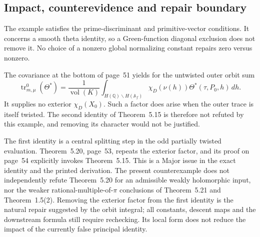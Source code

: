 \documentclass[10pt]{article}
\begin{document}
\subsection*{Impact, counterevidence and repair boundary}
The example satisfies the prime-discriminant and primitive-vector conditions. It concerns a smooth theta identity, so a Green-function diagonal exclusion does not remove it. No choice of a nonzero global normalizing constant repairs zero versus nonzero.\par
The covariance at the bottom of page 51 yields for the untwisted outer orbit sum \[\operatorname{tr}^0_{m,\mu}(\Theta^*)=
 \frac1{\operatorname{vol}(K)}
 \int_{H(\mathbb Q)\backslash H(\mathbb A_f)}
 \chi_D(\nu(h))\Theta^*(\tau,P_0,h)\,dh .\] It supplies no exterior \(\chi_D(X_0)\). Such a factor does arise when the outer trace is itself twisted. The second identity of Theorem 5.15 is therefore not refuted by this example, and removing its character would not be justified.\par
The first identity is a central splitting step in the odd partially twisted evaluation. Theorem 5.20, page 53, repeats the exterior factor, and its proof on page 54 explicitly invokes Theorem 5.15. This is a Major issue in the exact identity and the printed derivation. The present counterexample does not independently refute Theorem 5.20 for an admissible weakly holomorphic input, nor the weaker rational-multiple-of-\(\pi\) conclusions of Theorem 5.21 and Theorem 1.5(2). Removing the exterior factor from the first identity is the natural repair suggested by the orbit integral; all constants, descent maps and the downstream formula still require rechecking. Its local form does not reduce the impact of the currently false principal identity.\par
\end{document}
